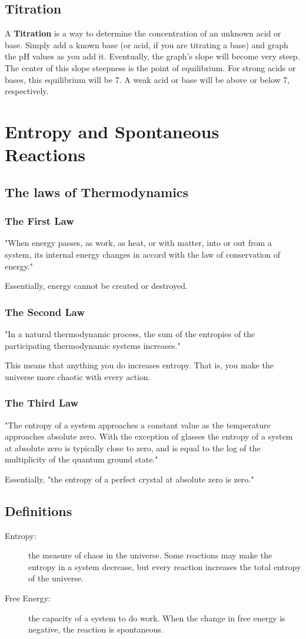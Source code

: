 \documentclass[]{article}
\begin{document}
\subsection{Titration}
A \textbf{Titration} is a way to determine the concentration of an unknown acid or base. Simply add a known base (or acid, if you are titrating a base) and graph the pH values as you add it. Eventually, the graph's slope will become very steep. The center of this slope steepness is the point of equilibrium. For strong acids or bases, this equilibrium will be 7. A weak acid or base will be above or below 7, respectively. 
\section{Entropy and Spontaneous Reactions}
\subsection{The laws of Thermodynamics}
\subsubsection{The First Law}
"When energy passes, as work, as heat, or with matter, into or out from a system, its internal energy changes in accord with the law of conservation of energy."

Essentially, energy cannot be created or destroyed. 
\subsubsection{The Second Law}
"In a natural thermodynamic process, the sum of the entropies of the participating thermodynamic systems increases."

This means that anything you do increases entropy.
That is, you make the universe more chaotic with every action.
\subsubsection{The Third Law}
"The entropy of a system approaches a constant value as the temperature approaches absolute zero. With the exception of glasses the entropy of a system at absolute zero is typically close to zero, and is equal to the log of the multiplicity of the quantum ground state."

Essentially, "the entropy of a perfect crystal at absolute zero is zero." 
\subsection{Definitions}
\begin{description}
\item[Entropy:] the measure of chaos in the universe. Some reactions may make the entropy in a system decrease, but every reaction increases the total entropy of the universe. 
\item[Free Energy:] the capacity of a system to do work. When the change in free energy is negative, the reaction is spontaneous. 
\end{description}
\end{document}
